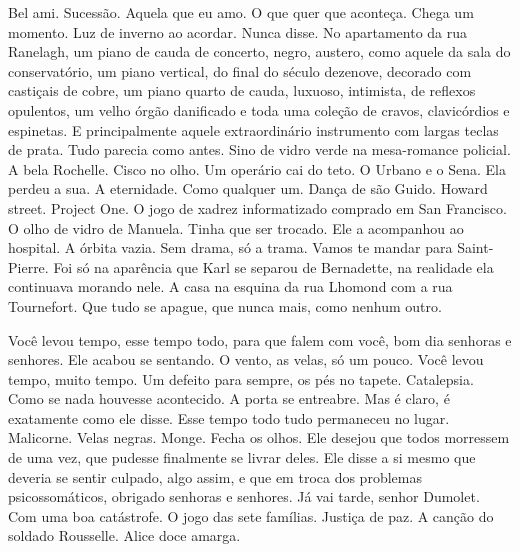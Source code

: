 Bel ami. Sucessão. Aquela que eu amo. O que quer que aconteça. Chega um
momento. Luz de inverno ao acordar. Nunca disse. No apartamento da rua
Ranelagh, um piano de cauda de concerto, negro, austero, como aquele da
sala do conservatório, um piano vertical, do final do século dezenove,
decorado com castiçais de cobre, um piano quarto de cauda, luxuoso,
intimista, de reflexos opulentos, um velho órgão danificado e toda uma
coleção de cravos, clavicórdios e espinetas. E principalmente aquele
extraordinário instrumento com largas teclas de prata. Tudo parecia como
antes. Sino de vidro verde na mesa-romance policial. A bela Rochelle.
Cisco no olho. Um operário cai do teto. O Urbano e o Sena. Ela perdeu a
sua. A eternidade. Como qualquer um. Dança de são Guido. Howard street.
Project One. O jogo de xadrez informatizado comprado em San Francisco. O
olho de vidro de Manuela. Tinha que ser trocado. Ele a acompanhou ao
hospital. A órbita vazia. Sem drama, só a trama. Vamos te mandar para
Saint-Pierre. Foi só na aparência que Karl se separou de Bernadette, na
realidade ela continuava morando nele. A casa na esquina da rua Lhomond
com a rua Tournefort. Que tudo se apague, que nunca mais, como nenhum
outro.

Você levou tempo, esse tempo todo, para que falem com você, bom dia
senhoras e senhores. Ele acabou se sentando. O vento, as velas, só um
pouco. Você levou tempo, muito tempo. Um defeito para sempre, os pés no
tapete. Catalepsia. Como se nada houvesse acontecido. A porta se
entreabre. Mas é claro, é exatamente como ele disse. Esse tempo todo
tudo permaneceu no lugar. Malicorne. Velas negras. Monge. Fecha os
olhos. Ele desejou que todos morressem de uma vez, que pudesse
finalmente se livrar deles. Ele disse a si mesmo que deveria se sentir
culpado, algo assim, e que em troca dos problemas psicossomáticos,
obrigado senhoras e senhores. Já vai tarde, senhor Dumolet. Com uma boa
catástrofe. O jogo das sete famílias. Justiça de paz. A canção do
soldado Rousselle. Alice doce amarga.
